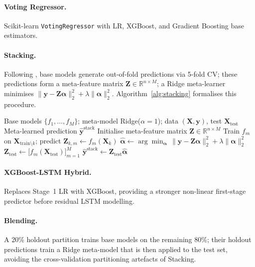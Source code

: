 \documentclass[a4paper,fleqn]{cas-dc}
\begin{document}
\paragraph{Voting Regressor.} Scikit-learn \texttt{VotingRegressor} with LR, XGBoost, and Gradient Boosting base estimators.

\paragraph{Stacking.}  Following \cite{wolpert1992stacking}, base models generate out-of-fold predictions via 5-fold CV; these predictions form a meta-feature matrix $\mathbf{Z}\in\mathbb{R}^{n\times M}$; a Ridge meta-learner minimises $\|\mathbf{y}-\mathbf{Z}\boldsymbol{\alpha}\|_2^2 + \lambda\|\boldsymbol{\alpha}\|_2^2$.  Algorithm~\ref{alg:stacking} formalises this procedure.

\begin{algorithm}[H]
\caption{Stacking Ensemble (Meta-Learning via 5-Fold CV)}
\label{alg:stacking}
\begin{algorithmic}[1]
\Require Base models $\{f_1,\ldots,f_M\}$; meta-model Ridge($\alpha{=}1$); data $(\mathbf{X},\mathbf{y})$, test $\mathbf{X}_{\text{test}}$
\Ensure Meta-learned prediction $\hat{\mathbf{y}}^{\text{stack}}$
\State Initialise meta-feature matrix $\mathbf{Z}\in\mathbb{R}^{n\times M}$
    \State Train $f_m$ on $\mathbf{X}_{\text{train}\setminus k}$; predict $\mathbf{Z}_{k,m}\gets f_m(\mathbf{X}_k)$
  \EndFor
\EndFor
\State $\boldsymbol{\hat{\alpha}} \gets \arg\min_{\boldsymbol{\alpha}}\,\|\mathbf{y}-\mathbf{Z}\boldsymbol{\alpha}\|_2^2 + \lambda\|\boldsymbol{\alpha}\|_2^2$
\State $\mathbf{Z}_{\text{test}} \gets \bigl[f_m(\mathbf{X}_{\text{test}})\bigr]_{m=1}^{M}$
\State \Return $\hat{\mathbf{y}}^{\text{stack}} \gets \mathbf{Z}_{\text{test}}\boldsymbol{\hat{\alpha}}$
\end{algorithmic}
\end{algorithm}

\paragraph{XGBoost-LSTM Hybrid.}  Replaces Stage~1 LR with XGBoost, providing a stronger non-linear first-stage predictor before residual LSTM modelling.

\paragraph{Blending.}  A 20\% holdout partition trains base models on the remaining 80\%; their holdout predictions train a Ridge meta-model that is then applied to the test set, avoiding the cross-validation partitioning artefacts of Stacking.
\end{document}
